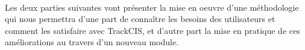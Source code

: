 			\paragraph{}%
			Les deux parties suivantes vont présenter la mise en oeuvre d'une
			méthodologie qui nous permettra d'une part de connaître les besoins des
			utilisateurs et comment les satisfaire avec TrackCIS, et d'autre part la
			mise en pratique de ces améliorations au travers d'un nouveau module.
			
			
			